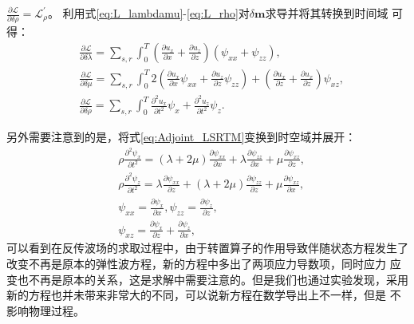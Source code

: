 $\frac{\partial\mathcal{L}}{\partial\delta\rho}=\mathcal{L}^{'}_{\rho}$。
利用式\ref{eq:L_lambdamu}-\ref{eq:L_rho}对$\delta\mathbf{m}$求导并将其转换到时间域
可得：
\begin{equation}
\begin{split}
   & \frac{\partial\mathcal{L}}{\partial \delta\lambda}=\sum_{s,r}\int^T_{0}
	(\frac{\partial u_x}{\partial x}+\frac{\partial u_z}{\partial z})(\psi_{xx}+\psi_{zz}),\\
   & \frac{\partial\mathcal{L}}{\partial \delta\mu}=\sum_{s,r}\int^T_{0}
	2(\frac{\partial u_x}{\partial x}\psi_{xx}+\frac{\partial u_z}{\partial z}\psi_{zz})+
	(\frac{\partial u_x}{\partial z}+\frac{\partial u_x}{\partial z})\psi_{xz},\\
   & \frac{\partial\mathcal{L}}{\partial \delta\rho}=\sum_{s,r}\int^T_{0}
	\frac{\partial^2 u_x}{\partial t^2}\psi_x+\frac{\partial^2 u_z}{\partial t^2}\psi_{z}.
    \label{eq:Gradient_lambdamurho_LSRTM}
\end{split}
\end{equation}

另外需要注意到的是，将式\ref{eq:Adjoint_LSRTM}变换到时空域并展开：
\begin{equation}
\begin{split}
   & \rho\frac{\partial^2 \psi_{x}}{\partial t^2}=	(\lambda+2\mu)\frac{\partial \psi_{xx}}{\partial x}+
		\lambda\frac{\partial \psi_{zz}}{\partial x}+\mu\frac{\partial \psi_{xz}}{\partial z},\\
   & \rho\frac{\partial^2 \psi_{z}}{\partial t^2}=	\lambda\frac{\partial \psi_{xx}}{\partial z}+
		(\lambda+2\mu)\frac{\partial \psi_{zz}}{\partial z}+\mu\frac{\partial \psi_{xz}}{\partial x},\\
   & \psi_{xx}=\frac{\partial \psi_x}{\partial x}, \psi_{zz}=\frac{\partial \psi_z}{\partial z},\\
   & \psi_{xz}=\frac{\partial \psi_x}{\partial z} + \frac{\partial \psi_z}{\partial x},
    \label{eq:Time_Adjoint_WE_LSRTM}
\end{split}
\end{equation}
可以看到在反传波场的求取过程中，由于转置算子的作用导致伴随状态方程发生了改变不再是原本的弹性波方程，新的方程中多出了两项应力导数项，同时应力
应变也不再是原本的关系，这是求解中需要注意的。但是我们也通过实验发现，采用新的方程也并未带来非常大的不同，可以说新方程在数学导出上不一样，但是
不影响物理过程。
